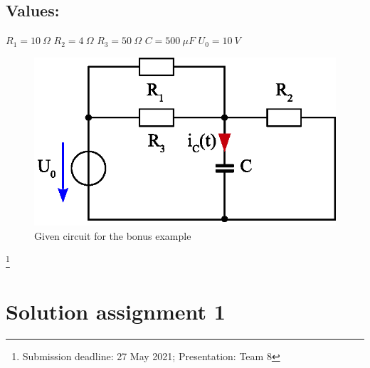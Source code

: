 \documentclass[a4paper]{article}
\newcommand\blfootnote[1]{%
	\begingroup
	\renewcommand\thefootnote{}\footnote{#1}%
	\addtocounter{footnote}{-1}%
	\endgroup
}
\begin{document}
\pagebreak
\subsection*{Values:}
$R_1 = 10~\Omega$ \qquad $R_2 = 4~\Omega$ \qquad $R_3 = 50~\Omega$ \qquad $C=500~\mu F$ \qquad $U_0 = 10~V$ \\

\begin{figure}[!htp]
	\centering
	\includegraphics[width=0.55\linewidth]{Figures/homework8_circuit_3}
	\caption{Given circuit for the bonus example}
	\label{fig:homework8circuitbonus}
\end{figure}

\blfootnote{Submission deadline: 27 May 2021; \qquad Presentation: Team 8}
\clearpage
\section{Solution assignment 1}
\end{document}
